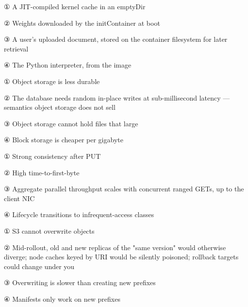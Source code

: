 \begin{tbboptions}
  \item ① A JIT-compiled kernel cache in an emptyDir
  \item ② Weights downloaded by the initContainer at boot
  \item ③ A user's uploaded document, stored on the container filesystem for later retrieval
  \item ④ The Python interpreter, from the image
\end{tbboptions}


\begin{tbboptions}
  \item ① Object storage is less durable
  \item ② The database needs random in-place writes at sub-millisecond latency — semantics object storage does not sell
  \item ③ Object storage cannot hold files that large
  \item ④ Block storage is cheaper per gigabyte
\end{tbboptions}


\begin{tbboptions}
  \item ① Strong consistency after PUT
  \item ② High time-to-first-byte
  \item ③ Aggregate parallel throughput scales with concurrent ranged GETs, up to the client NIC
  \item ④ Lifecycle transitions to infrequent-access classes
\end{tbboptions}


\begin{tbboptions}
  \item ① S3 cannot overwrite objects
  \item ② Mid-rollout, old and new replicas of the "same version" would otherwise diverge; node caches keyed by URI would be silently poisoned; rollback targets could change under you
  \item ③ Overwriting is slower than creating new prefixes
  \item ④ Manifests only work on new prefixes
\end{tbboptions}

